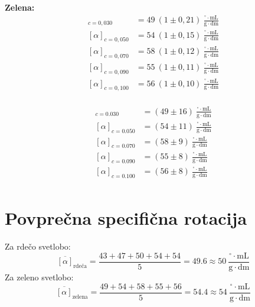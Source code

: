 \documentclass[a4paper,12pt]{article}
\begin{document}
\vspace{1em}

\begin{minipage}{0.48\textwidth}
\textbf{Zelena:}
\begin{align*}
[\alpha]_{c=0,030} &= 49 \ (1 \pm 0,21) \ \frac{^\circ \cdot \mathrm{mL}}{\mathrm{g} \cdot \mathrm{dm}} \\
[\alpha]_{c=0,050} &= 54 \ (1 \pm 0,15) \ \frac{^\circ \cdot \mathrm{mL}}{\mathrm{g} \cdot \mathrm{dm}} \\
[\alpha]_{c=0,070} &= 58 \ (1 \pm 0,12) \ \frac{^\circ \cdot \mathrm{mL}}{\mathrm{g} \cdot \mathrm{dm}} \\
[\alpha]_{c=0,090} &= 55 \ (1 \pm 0,11) \ \frac{^\circ \cdot \mathrm{mL}}{\mathrm{g} \cdot \mathrm{dm}} \\
[\alpha]_{c=0,100} &= 56 \ (1 \pm 0,10) \ \frac{^\circ \cdot \mathrm{mL}}{\mathrm{g} \cdot \mathrm{dm}} \\
\end{align*}
\end{minipage}
\hfill
\begin{minipage}{0.48\textwidth}

\begin{align*}
[\alpha]_{c=0.030} &= (49 \pm 16) \  \frac{^\circ \cdot \mathrm{mL}}{\mathrm{g} \cdot \mathrm{dm}} \\
[\alpha]_{c=0.050} &= (54 \pm 11) \  \frac{^\circ \cdot \mathrm{mL}}{\mathrm{g} \cdot \mathrm{dm}} \\
[\alpha]_{c=0.070} &= (58 \pm 9)  \ \frac{^\circ \cdot \mathrm{mL}}{\mathrm{g} \cdot \mathrm{dm}} \\
[\alpha]_{c=0.090} &= (55 \pm 8)  \ \frac{^\circ \cdot \mathrm{mL}}{\mathrm{g} \cdot \mathrm{dm}} \\
[\alpha]_{c=0.100} &= (56 \pm 8)  \ \frac{^\circ \cdot \mathrm{mL}}{\mathrm{g} \cdot \mathrm{dm}} \\
\end{align*}
\end{minipage}


\section*{Povprečna specifična rotacija}

Za rdečo svetlobo:
\[
\overline{[\alpha]}_{\text{rdeča}} = \frac{43 + 47 + 50 + 54 + 54}{5} = 49.6 \approx 50 \ \frac{^\circ \cdot \mathrm{mL}}{\mathrm{g} \cdot \mathrm{dm}}
\]
Za zeleno svetlobo:
\[
\overline{[\alpha]}_{\text{zelena}} = \frac{49 + 54 + 58 + 55 + 56}{5} = 54.4 \approx 54 \ \frac{^\circ \cdot \mathrm{mL}}{\mathrm{g} \cdot \mathrm{dm}}
\]
\end{document}
